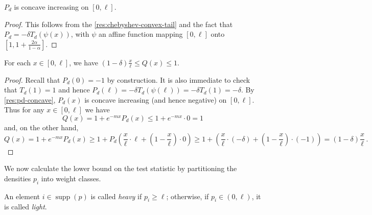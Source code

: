 \documentclass{theoretics}
\DeclareMathOperator{\supp}{supp}   %
\begin{document}
\begin{corollary}
    \label{res:pd-concave}
    $P_d$ is concave increasing on $[0, \ell]$.
\end{corollary}
\begin{proof}
    This follows from the \cref{res:chebyshev-convex-tail} and the fact that $P_d = -\delta
    T_d(\psi(x))$, with $\psi$ an affine function mapping $[0, \ell]$ onto $\left[ 1, 1 +
    \frac{2\alpha}{1-\alpha} \right]$.
\end{proof}

\begin{proposition}
    \label{res:q-light-bounds}
    For each $x \in [0, \ell]$, we have $(1-\delta) \frac{x}{\ell} \le Q(x) \le 1$.
\end{proposition}
\begin{proof}
    Recall that $P_d(0) = -1$ by construction. It is also immediate to check that $T_d(1) = 1$ and
    hence $P_d(\ell) = -\delta T_d(\psi(\ell)) = -\delta T_d(1) = -\delta$. By
    \cref{res:pd-concave}, $P_d(x)$ is concave increasing (and hence negative) on $[0, \ell]$.
    Thus for any $x \in [0, \ell]$ we have
    \[
        Q(x) = 1 + e^{-mx} P_d(x)
        \le 1 + e^{-mx} \cdot 0
        = 1
    \]
    and, on the other hand,
    \[
        Q(x) = 1 + e^{-mx} P_d(x)
        \ge 1 + P_d\left(
            \frac{x}{\ell} \cdot \ell + \left(1-\frac{x}{\ell}\right) \cdot 0
        \right)
        \ge 1 + \left(
            \frac{x}{\ell} \cdot (-\delta) + \left(1-\frac{x}{\ell}\right) \cdot (-1)
        \right)
        = (1-\delta) \frac{x}{\ell} \,.
    \]
\end{proof}

We now calculate the lower bound on the test statistic by partitioning the densities $p_i$ into
weight classes.

\begin{definition}
    \label{def:heavy}
    An element $i \in \supp(p)$ is called \emph{heavy} if $p_i \ge \ell$;
    otherwise, if $p_i \in (0, \ell)$, it is called \emph{light}.
\end{definition}
\end{document}
